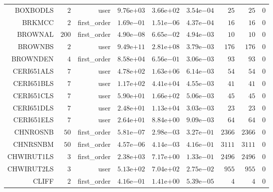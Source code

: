 \begin{longtable}{rrrrrrrrr}
BOXBODLS & \(     2\) & user & \( 9.76\)e\(+03\) & \( 3.66\)e\(+02\) & \( 3.54\)e\(-04\) & \(    25\) & \(    25\) & \(     0\) \\
BRKMCC & \(     2\) & first\_order & \( 1.69\)e\(-01\) & \( 1.51\)e\(-06\) & \( 4.37\)e\(-04\) & \(    16\) & \(    16\) & \(     0\) \\
BROWNAL & \(   200\) & first\_order & \( 4.90\)e\(-08\) & \( 6.65\)e\(-02\) & \( 4.94\)e\(-03\) & \(    10\) & \(    10\) & \(     0\) \\
BROWNBS & \(     2\) & user & \( 9.49\)e\(+11\) & \( 2.81\)e\(+08\) & \( 3.79\)e\(-03\) & \(   176\) & \(   176\) & \(     0\) \\
BROWNDEN & \(     4\) & first\_order & \( 8.58\)e\(+04\) & \( 6.56\)e\(-01\) & \( 3.06\)e\(-03\) & \(    93\) & \(    93\) & \(     0\) \\
CERI651ALS & \(     7\) & user & \( 4.78\)e\(+02\) & \( 1.63\)e\(+06\) & \( 6.14\)e\(-03\) & \(    54\) & \(    54\) & \(     0\) \\
CERI651BLS & \(     7\) & user & \( 1.17\)e\(+02\) & \( 4.41\)e\(+04\) & \( 4.55\)e\(-03\) & \(    41\) & \(    41\) & \(     0\) \\
CERI651CLS & \(     7\) & user & \( 5.90\)e\(+01\) & \( 1.66\)e\(+02\) & \( 5.06\)e\(-03\) & \(    45\) & \(    45\) & \(     0\) \\
CERI651DLS & \(     7\) & user & \( 2.48\)e\(+01\) & \( 1.13\)e\(+04\) & \( 3.03\)e\(-03\) & \(    23\) & \(    23\) & \(     0\) \\
CERI651ELS & \(     7\) & user & \( 2.64\)e\(+01\) & \( 8.84\)e\(+00\) & \( 9.09\)e\(-03\) & \(    64\) & \(    64\) & \(     0\) \\
CHNROSNB & \(    50\) & first\_order & \( 5.81\)e\(-07\) & \( 2.98\)e\(-03\) & \( 3.27\)e\(-01\) & \(  2366\) & \(  2366\) & \(     0\) \\
CHNRSNBM & \(    50\) & first\_order & \( 4.57\)e\(-06\) & \( 4.14\)e\(-03\) & \( 4.16\)e\(-01\) & \(  3111\) & \(  3111\) & \(     0\) \\
CHWIRUT1LS & \(     3\) & first\_order & \( 2.38\)e\(+03\) & \( 7.17\)e\(+00\) & \( 1.33\)e\(-01\) & \(  2496\) & \(  2496\) & \(     0\) \\
CHWIRUT2LS & \(     3\) & user & \( 5.13\)e\(+02\) & \( 7.04\)e\(+02\) & \( 2.75\)e\(-02\) & \(   955\) & \(   955\) & \(     0\) \\
CLIFF & \(     2\) & first\_order & \( 4.16\)e\(-01\) & \( 1.41\)e\(+00\) & \( 5.39\)e\(-05\) & \(     4\) & \(     4\) & \(     0\) \\

\end{longtable}
